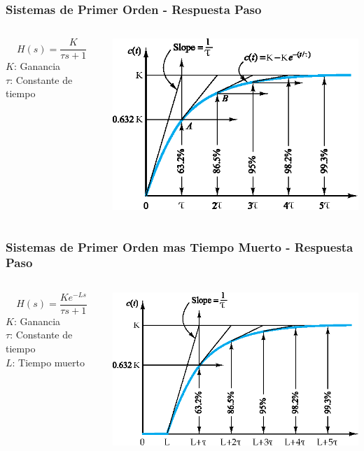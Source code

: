 \documentclass[aspectratio=169,handout]{beamer}
\theoremstyle{definition}
\theoremstyle{plain}
\theoremstyle{remark}
\begin{document}
\begin{frame}[<-+>][c]\frametitle{Sistemas de Primer Orden - Respuesta Paso}
\vspace*{3mm}
\begin{columns}
 \begin{column}{0.3\textwidth}
  \begin{equation*}
    H(s) = \frac{K}{\tau s + 1}
  \end{equation*}
  $K$: Ganancia\\
  $\tau$: Constante de tiempo
 \end{column} 
 \begin{column}{0.7\textwidth}
  \centering
  \includegraphics[width=10cm]{images/firstOrderResponse.eps}
 \end{column} 
\end{columns}
\end{frame}

\begin{frame}[<-+>]\frametitle{Sistemas de Primer Orden mas Tiempo Muerto - Respuesta Paso}
\vspace*{3mm}
\begin{columns}
 \begin{column}{0.3\textwidth}
  \begin{equation*}
    H(s) = \frac{K e^{-Ls}}{\tau s + 1}
  \end{equation*}
  $K$: Ganancia\\
  $\tau$: Constante de tiempo\\
  $L$: Tiempo muerto
 \end{column} 
 \begin{column}{0.7\textwidth}
  \centering
  \includegraphics[width=10cm]{images/firstOrder+deadTimeResponse.eps}
 \end{column} 
\end{columns}
\end{frame}
\end{document}
